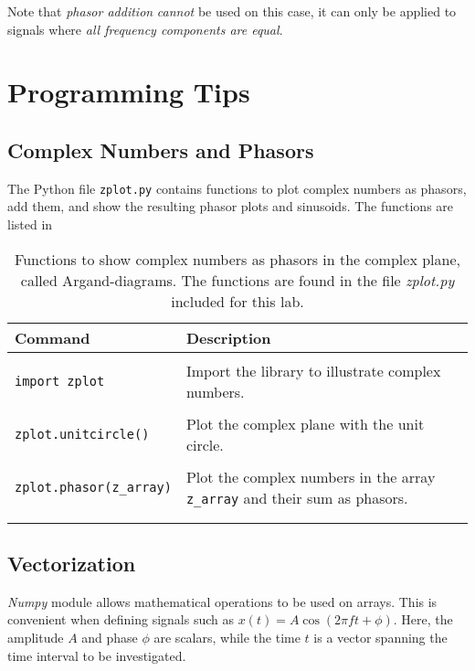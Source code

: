 Note that \emph{phasor addition} \emph{cannot} be used on this case, it can only be applied to signals where \emph{all frequency components are equal}.

\section{Programming Tips}

\subsection{Complex Numbers and Phasors}
The Python file \verb|zplot.py| contains functions to plot complex numbers as phasors, add them, and show the resulting phasor plots and sinusoids. The functions are listed in 

\begin{table}
	\caption{Functions to show complex numbers as phasors in the complex plane, called Argand-diagrams. The functions are found in the file \emph{zplot.py} included for this lab. }
	\label{tab:zplot}
	\begin{tabularx}{\textwidth}{lX}
		\\
		Command					& Description		\\
		\hline \\
		\verb|import zplot| & 
		\multicolumn{1}{l}{Import the library to illustrate complex numbers. } \\
		\\
		\verb|zplot.unitcircle()|		& Plot the complex plane with the unit circle. \\ \\
		\verb|zplot.phasor(z_array)|  	& Plot the complex numbers in the \numpy array \verb|z_array| and their sum as phasors. \\ \\
		\hline \\
	\end{tabularx}
	
\end{table}


\subsection{Vectorization}
\emph{Numpy} module allows mathematical operations to be used on arrays. This is convenient when defining signals such as $x(t)=A \cos(2\pi f t + \phi)$. Here, the amplitude $A$ and phase $\phi$ are scalars, while the time $t$ is a vector spanning the time interval to be investigated. 

